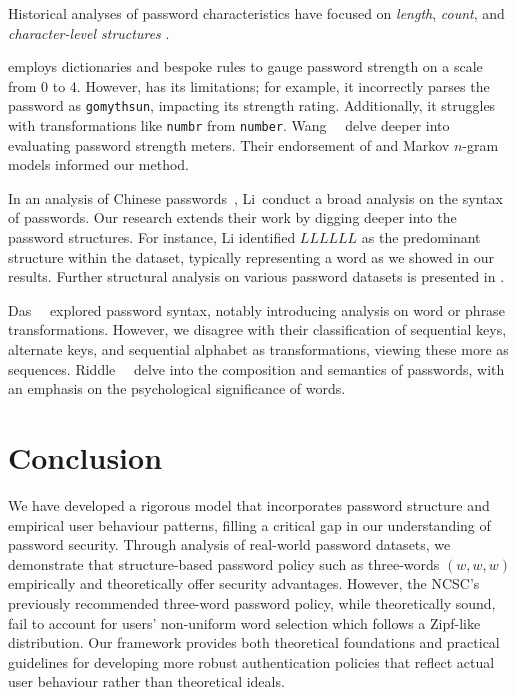 Historical analyses of password characteristics have focused on \textit{length}, \textit{count}, and \textit{character-level structures} \cite{Ma_Yang_Luo_Li_2014, Li_Han_Xu_2014, Das_Bonneau_Caesar_Borisov_Wang_2014, ur_et_al_2015, Li_Wang_Sun_2016, pearman_et_al_2017, Pasquini_Cianfriglia_Ateniese_Bernaschi_2021, Cazier_Medlin_2006}.

\zxcvbn employs dictionaries and bespoke rules to gauge password strength on a scale from 0 to 4. However, \zxcvbnnocite has its limitations; for example, it incorrectly parses the password  as \texttt{go\;myths\;un}, impacting its strength rating. Additionally, it struggles with transformations like \texttt{numbr} from \texttt{number}. Wang~\etal~\cite{Wang_Shan_Dong_Shen_Jia_2023} delve deeper into evaluating password strength meters. Their endorsement of \zxcvbnnocite and Markov $n$-gram models informed our method.

In an analysis of Chinese passwords~\cite{Li_Han_Xu_2014}, Li~\etal conduct a broad analysis on the syntax of passwords. Our research extends their work by digging deeper into the password structures. For instance, Li \etal identified $LLLLLL$ as the predominant structure within the  dataset, typically representing a word as we showed in our results. Further structural analysis on various password datasets is presented in \cite{Li_Wang_Sun_personal_info_2016}.

Das~\etal~\cite{Das_Bonneau_Caesar_Borisov_Wang_2014} explored password syntax, notably introducing analysis on word or phrase transformations. However, we disagree with their classification of sequential keys, alternate keys, and sequential alphabet as transformations, viewing these more as sequences. Riddle~\etal~\cite{Riddle_Miron_Semo_1989} delve into the composition and semantics of passwords, with an emphasis on the psychological significance of words.


\section{Conclusion}
We have developed a rigorous model that incorporates password structure and empirical user behaviour patterns, filling a critical gap in our understanding of password security. Through analysis of real-world password datasets, we demonstrate that structure-based password policy such as three-words $(w,w,w)$ empirically and theoretically offer security advantages. However, the NCSC's previously recommended three-word password policy, while theoretically sound, fail to account for users' non-uniform word selection which follows a Zipf-like distribution. Our framework provides both theoretical foundations and practical guidelines for developing more robust authentication policies that reflect actual user behaviour rather than theoretical ideals.

